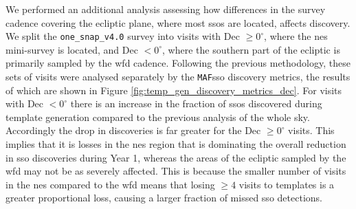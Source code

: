 \documentclass[preprintm,linenumbers]{aastex631}
\newcommand{\baseline}{\texttt{one\_snap\_v4.0}\xspace}
\newcommand{\maf}{\texttt{MAF}\xspace}
\begin{document}
We performed an additional analysis assessing how differences in the survey cadence covering the ecliptic plane, where most \glspl*{sso} are located, affects discovery.
We split the \baseline survey into visits with Dec $\geq 0^{\circ}$, where the \gls*{nes} mini-survey is located, and Dec $< 0^{\circ}$, where the southern part of the ecliptic is primarily sampled by the \gls*{wfd} cadence.
  Following the previous methodology, these sets of visits were analysed separately by the \maf \gls*{sso} discovery metrics, the results of which are shown in Figure \ref{fig:temp_gen_discovery_metrics_dec}.
For visits with Dec $<0^{\circ}$ there is an increase in the fraction of \glspl*{sso} discovered during template generation compared to the previous analysis of the whole sky.
Accordingly the drop in discoveries is far greater for the Dec $\geq 0^{\circ}$ visits.
This implies that it is losses in the \gls*{nes} region that is dominating the overall reduction in \gls*{sso} discoveries during Year 1, whereas the areas of the ecliptic sampled by the \gls*{wfd} may not be as severely affected.
This is because the smaller number of visits in the \gls*{nes} compared to the \gls*{wfd} means that losing $\geq4$ visits to templates is a greater proportional loss, causing a larger fraction of missed \gls*{sso} detections.
		
\end{document}
